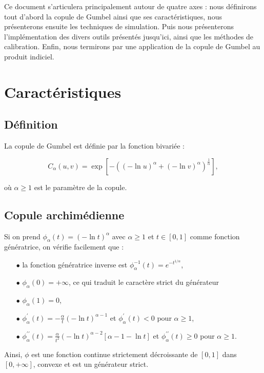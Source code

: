 \documentclass[11pt,a4paper]{article}
\begin{document}
Ce document s'articulera principalement autour de quatre axes : nous d\'e\-finirons tout d'abord la 
copule de Gumbel ainsi que ses caract\'eristiques, nous pr\'esenterons ensuite les techniques 
de simulation. Puis nous pr\'esenterons l'impl\'ementation des divers outils pr\'esent\'es jusqu'ici, ainsi
que les m\'ethodes de calibration. Enfin, nous termirons par une application de la copule de Gumbel
au produit indiciel.

\section{Caract\'eristiques}

\subsection{D\'efinition}

La copule de Gumbel est d\'efinie par la fonction bivari\'ee :

$$C_\alpha\left(u,v\right)=\exp\left[-\left(\left(-\ln u\right)^\alpha+\left(-\ln v\right)^\alpha\right)^{\frac{1}{\alpha}}\right],$$

o\`u $\alpha\geq1$ est le param\`etre de la copule.

\subsection{Copule archim\'edienne}
Si on prend $\phi_\alpha(t)=\left(-\ln t\right)^\alpha$ avec $\alpha\geq1$ et $t\in [0,1]$ comme fonction g\'en\'eratrice, on v\'erifie facilement que :

\begin{itemize}
\item[]
\item[$\bullet$] la fonction g\'en\'eratrice inverse est $\phi_\alpha^{-1}(t)=e^{-t^{1/\alpha}}$,
\item[]
\item[$\bullet$] $\phi_\alpha(0)=+\infty$, ce qui traduit le caract\`ere strict du g\'en\'erateur
\item[]
\item[$\bullet$] $\phi_\alpha(1)=0$,
\item[]
\item[$\bullet$] $\phi_\alpha^\prime(t)=-\frac{\alpha}{t}(-\ln t)^{\alpha-1}$ et $\phi_\alpha^\prime(t)<0$ pour $\alpha\geq1$,
\item[]
\item[$\bullet$] $\phi_\alpha^{\prime\prime}(t)=\frac{\alpha}{t^2}(-\ln t)^{\alpha-2}\left[\alpha-1-\ln t\right]$ et $\phi_\alpha^{\prime\prime}(t)\geq0$ pour $\alpha\geq1$.
\item[]
\end{itemize}
Ainsi, $\phi$ est une fonction continue strictement d\'ecroissante de $[0,1]$ dans $[0,+\infty]$, convexe et est un
g\'en\'erateur strict.
\end{document}
